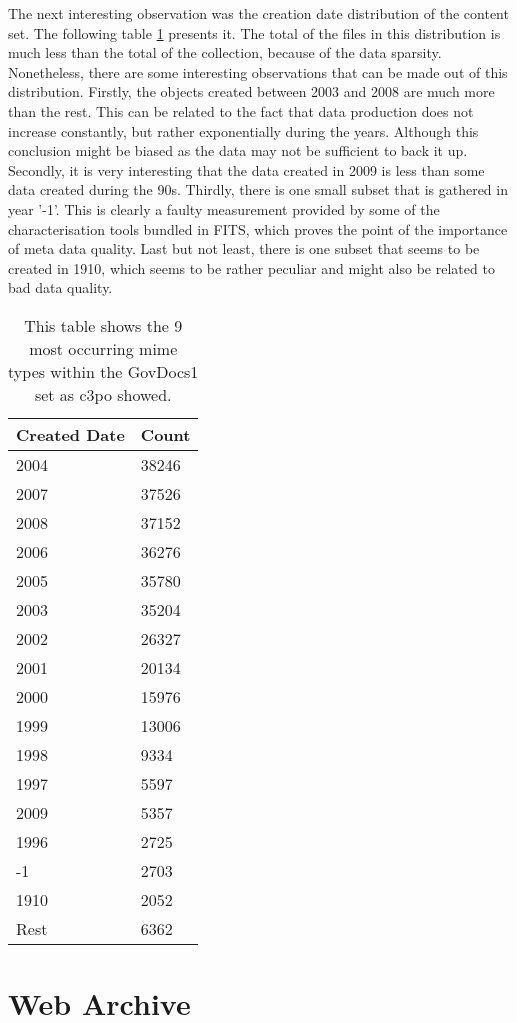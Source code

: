 The next interesting observation was the creation date distribution of the content set. The following table \ref{tab:govdocs1_created} presents it. The total of the files in this distribution is much less than the total of the collection, because of the data sparsity. Nonetheless, there are some interesting observations that can be made out of this distribution. Firstly, the objects created between 2003 and 2008 are much more than the rest. This can be related to the fact that data production does not increase constantly, but rather exponentially during the years. Although this conclusion might be biased as the data may not be sufficient to back it up. Secondly, it is very interesting that the data created in 2009 is  less than some data created during the 90s. Thirdly, there is one small subset that is gathered in year '-1'. This is clearly a faulty measurement provided by some of the characterisation tools bundled in FITS, which proves the point of the importance of meta data quality. 
Last but not least, there is one subset that seems to be created in 1910, which seems to be rather peculiar and might also be related to bad data quality.

\begin{table}[h]
\centering
\begin{tabular}{l || l }
\hline
Created Date & Count \\
\hline
\hline
2004 	& 38246 \\
2007 	&  37526 \\
2008		&  37152 \\
2006 	&  36276 \\
2005		&  35780 \\
2003		&  35204 \\
2002		&  26327 \\
2001		&  20134 \\
2000		& 15976 \\
1999		& 13006 \\
1998		&  9334 \\
1997		&  5597 \\
2009		&  5357\\
1996		&  2725\\
-1		&  2703\\
1910		&  2052\\
Rest		&  6362\\
 \hline
\end{tabular}
\caption{This table shows the 9 most occurring mime types within the GovDocs1 set as c3po showed.}
\label{tab:govdocs1_created}
\end{table}




\section{Web Archive}